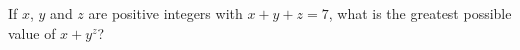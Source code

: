 If $x$, $y$ and $z$ are positive integers with $x+y+z=7$, what is the greatest possible value of $x+y^z$?

